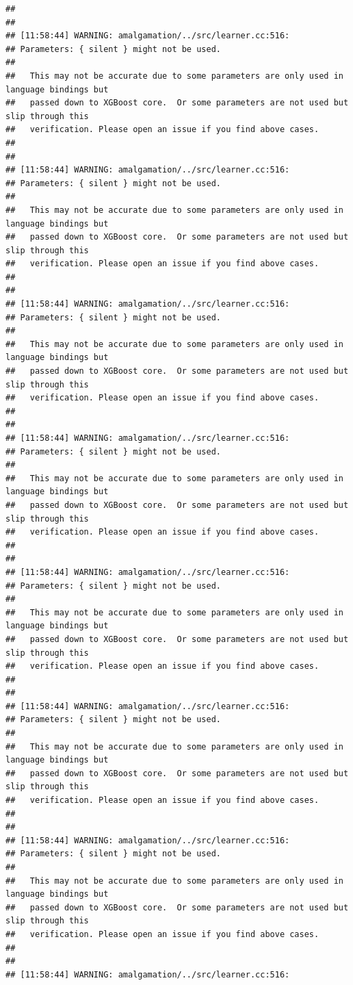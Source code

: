 \documentclass[AMS,STIX2COL]{WileyNJD-v2}\usepackage[]{graphicx}\usepackage[]{color}
\makeatletter
\newenvironment{kframe}{%
 \def\at@end@of@kframe{}%
 \ifinner\ifhmode%
  \def\at@end@of@kframe{\end{minipage}}%
  \begin{minipage}{\columnwidth}%
 \fi\fi%
 \def\FrameCommand##1{\hskip\@totalleftmargin \hskip-\fboxsep
 \colorbox{shadecolor}{##1}\hskip-\fboxsep
     \hskip-\linewidth \hskip-\@totalleftmargin \hskip\columnwidth}%
 \MakeFramed {\advance\hsize-\width
   \@totalleftmargin\z@ \linewidth\hsize
   \@setminipage}}%
 {\par\unskip\endMakeFramed%
 \at@end@of@kframe}
\newenvironment{knitrout}{}{} %
\makeatother
\begin{document}
\begin{knitrout}
\begin{kframe}
\begin{verbatim}
## 
## 
## [11:58:44] WARNING: amalgamation/../src/learner.cc:516: 
## Parameters: { silent } might not be used.
## 
##   This may not be accurate due to some parameters are only used in language bindings but
##   passed down to XGBoost core.  Or some parameters are not used but slip through this
##   verification. Please open an issue if you find above cases.
## 
## 
## [11:58:44] WARNING: amalgamation/../src/learner.cc:516: 
## Parameters: { silent } might not be used.
## 
##   This may not be accurate due to some parameters are only used in language bindings but
##   passed down to XGBoost core.  Or some parameters are not used but slip through this
##   verification. Please open an issue if you find above cases.
## 
## 
## [11:58:44] WARNING: amalgamation/../src/learner.cc:516: 
## Parameters: { silent } might not be used.
## 
##   This may not be accurate due to some parameters are only used in language bindings but
##   passed down to XGBoost core.  Or some parameters are not used but slip through this
##   verification. Please open an issue if you find above cases.
## 
## 
## [11:58:44] WARNING: amalgamation/../src/learner.cc:516: 
## Parameters: { silent } might not be used.
## 
##   This may not be accurate due to some parameters are only used in language bindings but
##   passed down to XGBoost core.  Or some parameters are not used but slip through this
##   verification. Please open an issue if you find above cases.
## 
## 
## [11:58:44] WARNING: amalgamation/../src/learner.cc:516: 
## Parameters: { silent } might not be used.
## 
##   This may not be accurate due to some parameters are only used in language bindings but
##   passed down to XGBoost core.  Or some parameters are not used but slip through this
##   verification. Please open an issue if you find above cases.
## 
## 
## [11:58:44] WARNING: amalgamation/../src/learner.cc:516: 
## Parameters: { silent } might not be used.
## 
##   This may not be accurate due to some parameters are only used in language bindings but
##   passed down to XGBoost core.  Or some parameters are not used but slip through this
##   verification. Please open an issue if you find above cases.
## 
## 
## [11:58:44] WARNING: amalgamation/../src/learner.cc:516: 
## Parameters: { silent } might not be used.
## 
##   This may not be accurate due to some parameters are only used in language bindings but
##   passed down to XGBoost core.  Or some parameters are not used but slip through this
##   verification. Please open an issue if you find above cases.
## 
## 
## [11:58:44] WARNING: amalgamation/../src/learner.cc:516: 

\end{verbatim}
\end{kframe}
\end{knitrout}
\end{document}
